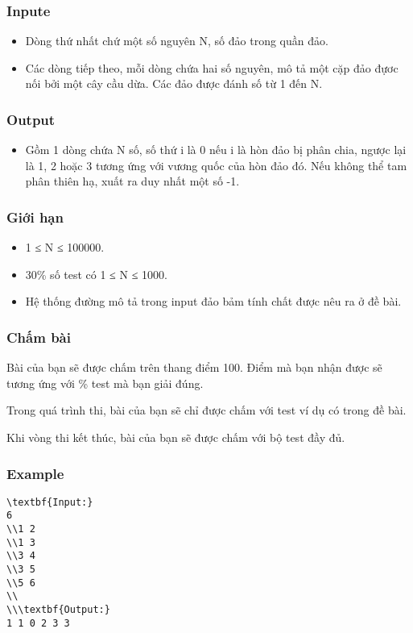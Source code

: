 \subsubsection{   Inpute  }
\begin{itemize}
	\item     Dòng thứ nhất chứ một số nguyên N, số đảo trong quần đảo.   
	\item     Các dòng tiếp theo, mỗi dòng chứa hai số nguyên, mô tả một cặp đảo đựơc nối bởi một cây cầu dừa. Các đảo được đánh số từ 1 đến N.   
\end{itemize}

\subsubsection{   Output  }
\begin{itemize}
	\item     Gồm 1 dòng chứa N số, số thứ i là 0 nếu i là hòn đảo bị phân chia, ngược lại là 1, 2 hoặc 3 tương ứng với vương quốc của hòn đảo đó. Nếu không thể tam phân thiên hạ, xuất ra duy nhất một số -1.   
\end{itemize}

\subsubsection{   Giới hạn  }
\begin{itemize}
	\item     1 ≤ N ≤ 100000.   
	\item     30\% số test có 1 ≤ N ≤ 1000.   
	\item     Hệ thống đường mô tả trong input đảo bảm tính chất được nêu ra ở đề bài.   
\end{itemize}

\subsubsection{   Chấm bài  }

   Bài của bạn sẽ được chấm trên thang điểm 100. Điểm mà bạn nhận được sẽ tương ứng với \% test mà bạn giải đúng.  

   Trong quá trình thi, bài của bạn sẽ chỉ được chấm với test ví dụ có trong đề bài.  

   Khi vòng thi kết thúc, bài của bạn sẽ được chấm với bộ test đầy đủ.  

\subsubsection{   Example  }
\begin{verbatim}
\textbf{Input:}
6
\\1 2
\\1 3
\\3 4
\\3 5
\\5 6
\\
\\\textbf{Output:}
1 1 0 2 3 3
\end{verbatim}
